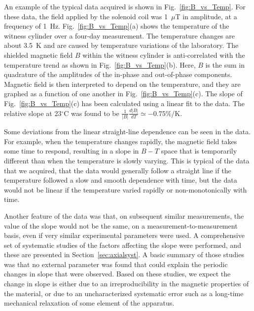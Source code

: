 An example of the typical data acquired is shown in
Fig.~\ref{fig:B_vs_Temp}.  For these data, the field applied by the
solenoid coil was 1~$\mu$T in amplitude, at a frequency of 1~Hz.
Fig.~\ref{fig:B_vs_Temp}(a) shows the temperature of the witness
cylinder over a four-day measurement.  The temperature changes are
about 3.5~K and are caused by temperature variations of the
laboratory.
%
%
The shielded magnetic field $B$ within the witness cylinder is
anti-correlated with the temperature trend as shown in
Fig.~\ref{fig:B_vs_Temp}(b).  Here, $B$ is the sum in quadrature of
the amplitudes of the in-phase and out-of-phase components.  Magnetic
field is then interpreted to depend on the temperature, and they are
graphed as a function of one another in Fig.~\ref{fig:B_vs_Temp}(c).
The slope of Fig.~\ref{fig:B_vs_Temp}(c) has been calculated using a
linear fit to the data.  The relative slope at 23$^\circ$C was found
to be $\frac{1}{|B|}\frac{d|B|}{dT}\simeq -0.75\%$/K.

Some deviations from the linear straight-line dependence can be seen
in the data.  For example, when the temperature changes rapidly, the
magnetic field takes some time to respond, resulting in a slope in
$B-T$ space that is temporarily different than when the temperature is
slowly varying.  This is typical of the data that we acquired, that
the data would generally follow a straight line if the temperature
followed a slow and smooth dependence with time, but the data would
not be linear if the temperature varied rapidly or non-monotonically
with time.

Another feature of the data was that, on subsequent similar
measurements, the value of the slope would not be the same, on a
measurement-to-measurement basis, even if very similar experimental
parameters were used.  A comprehensive set of systematic studies of
the factors affecting the slope were performed, and these are
presented in Section~\ref{sec:axialsyst}.  A basic summary of those
studies was that no external parameter was found that could explain
the periodic changes in slope that were observed.  Based on these
studies, we expect the change in slope is either due to an
irreproducibility in the magnetic properties of the material, or due
to an uncharacterized systematic error such as a long-time mechanical
relaxation of some element of the apparatus.


